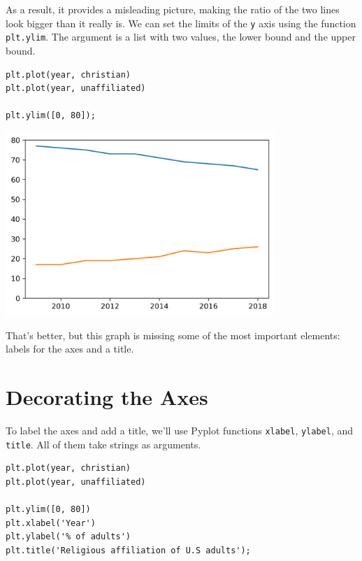 As a result, it provides a misleading picture, making the ratio of the
two lines look bigger than it really is. We can set the limits of the
\passthrough{\lstinline!y!} axis using the function
\passthrough{\lstinline!plt.ylim!}. The argument is a list with two
values, the lower bound and the upper bound.

\begin{lstlisting}[]
plt.plot(year, christian)
plt.plot(year, unaffiliated)

plt.ylim([0, 80]);
\end{lstlisting}

\begin{center}
\includegraphics[width=4in]{06_plotting_files/06_plotting_28_0.png}
\end{center}

That's better, but this graph is missing some of the most important
elements: labels for the axes and a title.

\hypertarget{decorating-the-axes}{%
\section{Decorating the Axes}\label{decorating-the-axes}}

To label the axes and add a title, we'll use Pyplot functions
\passthrough{\lstinline!xlabel!}, \passthrough{\lstinline!ylabel!}, and
\passthrough{\lstinline!title!}. All of them take strings as arguments.

\begin{lstlisting}[]
plt.plot(year, christian)
plt.plot(year, unaffiliated)

plt.ylim([0, 80])
plt.xlabel('Year')
plt.ylabel('% of adults')
plt.title('Religious affiliation of U.S adults');
\end{lstlisting}

